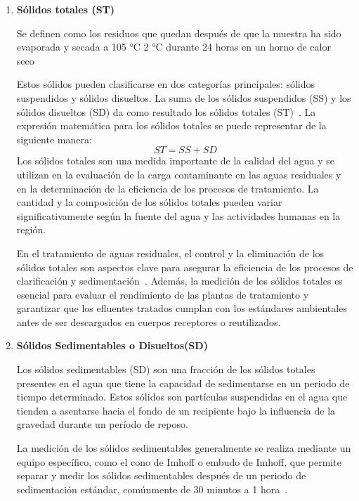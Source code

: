\begin{enumerate}[label=\textbf{$\bullet$}]
	\item \textbf{Sólidos totales (ST)}\par
	Se definen como los residuos que quedan después de que la muestra ha sido evaporada y secada a 105 °C  2 °C durante 24 horas en un horno de calor seco~\citep{Economia2015}\par
	Estos sólidos pueden clasificarse en dos categorías principales: sólidos suspendidos y sólidos disueltos. La suma de los sólidos suspendidos (SS) y los sólidos disueltos (SD) da como resultado los sólidos totales (ST)~\citep{metcalf2003}. La expresión matemática para los sólidos totales se puede representar de la siguiente manera:
	\begin{equation*}
		ST = SS + SD
	\end{equation*}
	Los sólidos totales son una medida importante de la calidad del agua y se utilizan en la evaluación de la carga contaminante en las aguas residuales y en la determinación de la eficiencia de los procesos de tratamiento. La cantidad y la composición de los sólidos totales pueden variar significativamente según la fuente del agua y las actividades humanas en la región.\par
	En el tratamiento de aguas residuales, el control y la eliminación de los sólidos totales son aspectos clave para asegurar la eficiencia de los procesos de clarificación y sedimentación~\citep{lazcano2016}. Además, la medición de los sólidos totales es esencial para evaluar el rendimiento de las plantas de tratamiento y garantizar que los efluentes tratados cumplan con los estándares ambientales antes de ser descargados en cuerpos receptores o reutilizados.
	\item \textbf{Sólidos Sedimentables o Disueltos(SD)} \par
	Los sólidos sedimentables (SD) son una fracción de los sólidos totales presentes en el agua que tiene la capacidad de sedimentarse en un periodo de tiempo determinado. Estos sólidos son partículas suspendidas en el agua que tienden a asentarse hacia el fondo de un recipiente bajo la influencia de la gravedad durante un período de reposo.\par
	La medición de los sólidos sedimentables generalmente se realiza mediante un equipo específico, como el cono de Imhoff o embudo de Imhoff, que permite separar y medir los sólidos sedimentables después de un periodo de sedimentación estándar, comúnmente de 30 minutos a 1 hora~\citep{metcalf2003}.\par

\end{enumerate}
